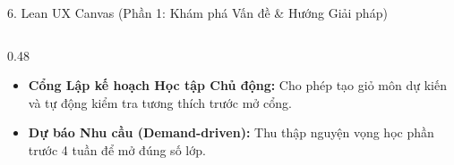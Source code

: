 \documentclass[aspectratio=169, 10pt]{beamer}
\begin{document}
\begin{frame}{6. Lean UX Canvas (Phần 1: Khám phá Vấn đề \& Hướng Giải pháp)}
\begin{columns}[T]
\begin{column}{0.48\textwidth}
            \vspace{0.08cm}
            \begin{tcolorbox}[colback=CardBg, colframe=WarmAmber, title=Box 5: Hướng Giải pháp (Solutions)]
                \footnotesize
                \begin{itemize}
                    \item \textbf{Cổng Lập kế hoạch Học tập Chủ động:} Cho phép tạo giỏ môn dự kiến và tự động kiểm tra tương thích trước mở cổng.
                    \item \textbf{Dự báo Nhu cầu (Demand-driven):} Thu thập nguyện vọng học phần trước 4 tuần để mở đúng số lớp.
                \end{itemize}
            \end{tcolorbox}
        \end{column}
    \end{columns}
\end{frame}
\end{document}
